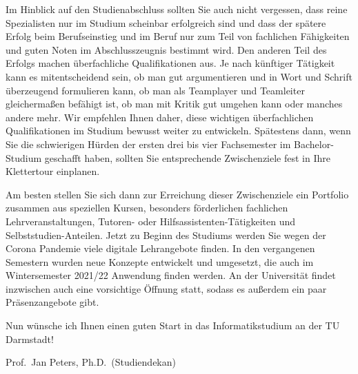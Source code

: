 {    Im Hinblick auf den Studienabschluss sollten Sie auch nicht vergessen, dass reine Spezialisten nur im Studium scheinbar erfolgreich sind und dass der spätere Erfolg beim Berufseinstieg und im Beruf nur zum Teil von fachlichen Fähigkeiten und guten Noten im Abschlusszeugnis bestimmt wird. Den anderen Teil des Erfolgs machen überfachliche Qualifikationen aus. Je nach künftiger Tätigkeit kann es mitentscheidend sein, ob man gut argumentieren und in Wort und Schrift überzeugend formulieren kann, ob man als Teamplayer und Teamleiter gleichermaßen befähigt ist, ob man mit Kritik gut umgehen kann oder manches andere mehr. Wir empfehlen Ihnen daher, diese wichtigen überfachlichen Qualifikationen im Studium bewusst weiter zu entwickeln. Spätestens dann, wenn Sie die schwierigen Hürden der ersten drei bis vier Fachsemester im Bachelor-Studium geschafft haben, sollten Sie entsprechende Zwischenziele fest in Ihre Klettertour einplanen.

    Am besten stellen Sie sich dann zur Erreichung dieser Zwischenziele ein Portfolio zusammen aus speziellen Kursen, besonders förderlichen fachlichen Lehrveranstaltungen, Tutoren- oder Hilfsassistenten-Tätigkeiten und Selbststudien-Anteilen. Jetzt zu Beginn des Studiums werden Sie wegen der Corona Pandemie viele digitale Lehrangebote finden. In den vergangenen Semestern wurden neue Konzepte entwickelt und umgesetzt, die auch im Wintersemester 2021/22 Anwendung finden werden. An der Universität findet inzwischen auch eine vorsichtige Öffnung statt, sodass es außerdem ein paar Präsenzangebote gibt.

    Nun wünsche ich Ihnen einen guten Start in das Informatikstudium an der TU Darmstadt!
}
{Prof.~Jan Peters, Ph.D.~(Studiendekan)}

\newpage
